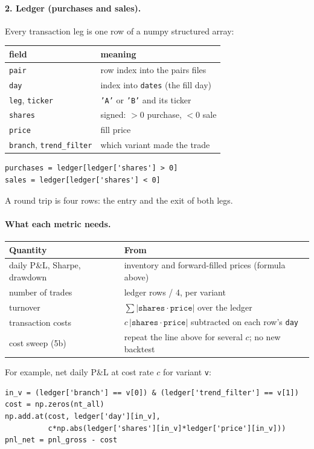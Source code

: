 \documentclass[11pt]{article}
\begin{document}
\paragraph{2. Ledger (purchases and sales).} Every transaction leg is one row
of a numpy structured array:
\begin{center}
\small
\begin{tabular}{ll}
    \toprule
    field & meaning \\
    \midrule
    \texttt{pair} & row index into the pairs files \\
    \texttt{day} & index into \texttt{dates} (the fill day) \\
    \texttt{leg}, \texttt{ticker} & \texttt{'A'} or \texttt{'B'} and its ticker \\
    \texttt{shares} & signed: $> 0$ purchase, $< 0$ sale \\
    \texttt{price} & fill price \\
    \texttt{branch}, \texttt{trend\_filter} & which variant made the trade \\
    \bottomrule
\end{tabular}
\end{center}
\begin{lstlisting}
purchases = ledger[ledger['shares'] > 0]
sales = ledger[ledger['shares'] < 0]
\end{lstlisting}
A round trip is four rows: the entry and the exit of both legs.

\paragraph{What each metric needs.}
\begin{center}
\small
\begin{tabular}{lp{}}
    \toprule
    Quantity & From \\
    \midrule
    daily P\&L, Sharpe, drawdown & inventory and forward-filled prices (formula above) \\
    number of trades & ledger rows / 4, per variant \\
    turnover & $\sum |\texttt{shares}\cdot\texttt{price}|$ over the ledger \\
    transaction costs & $c\,|\texttt{shares}\cdot\texttt{price}|$ subtracted on each row's \texttt{day} \\
    cost sweep (5b) & repeat the line above for several $c$; no new backtest \\
    \bottomrule
\end{tabular}
\end{center}
For example, net daily P\&L at cost rate $c$ for variant \texttt{v}:
\begin{lstlisting}
in_v = (ledger['branch'] == v[0]) & (ledger['trend_filter'] == v[1])
cost = np.zeros(nt_all)
np.add.at(cost, ledger['day'][in_v],
          c*np.abs(ledger['shares'][in_v]*ledger['price'][in_v]))
pnl_net = pnl_gross - cost
\end{lstlisting}
\end{document}
